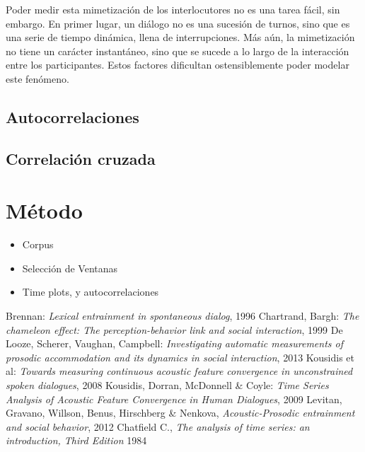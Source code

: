 \documentclass[11pt,a4paper,twoside]{tesis}
\begin{document}
Poder medir esta mimetización de los interlocutores no es una tarea fácil, sin embargo. En primer lugar, un diálogo no es una sucesión de turnos, sino que es una serie de tiempo dinámica, llena de interrupciones. Más aún, la mimetización no tiene un carácter instantáneo, sino que se sucede a lo largo de la interacción entre los participantes. Estos factores dificultan ostensiblemente poder modelar este fenómeno.



\subsection{Autocorrelaciones}
\subsection{Correlación cruzada}


\section{Método}

\begin{itemize}
\item Corpus
\item Selección de Ventanas
\item Time plots, y autocorrelaciones
\end{itemize}

\backmatter
\begin{thebibliography}{9}
    Brennan:
    \emph{Lexical entrainment in spontaneous dialog},
    1996
    Chartrand, Bargh:
    \emph{The chameleon effect: The perception-behavior link and social interaction},
    1999
    De Looze, Scherer, Vaughan, Campbell:
    \emph{Investigating automatic measurements of prosodic accommodation and its dynamics in social interaction},
    2013
    Kousidis et al:
    \emph{Towards measuring continuous acoustic feature convergence in unconstrained spoken dialogues},
    2008
    Kousidis, Dorran, McDonnell \& Coyle:
    \emph{Time Series Analysis of Acoustic Feature Convergence in Human Dialogues},
    2009
    Levitan, Gravano, Willson, Benus, Hirschberg \& Nenkova,
    \emph{Acoustic-Prosodic entrainment and social behavior},
    2012
    Chatfield C.,
    \emph{The analysis of time series: an introduction, Third Edition}
    1984
\end{thebibliography}
\end{document}
